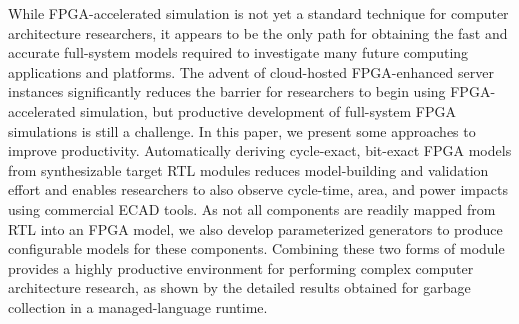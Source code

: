 While FPGA-accelerated simulation is not yet a standard technique for
computer architecture researchers, it appears to be the only path for
obtaining the fast and accurate full-system models required to
investigate many future computing applications and platforms.  The
advent of cloud-hosted FPGA-enhanced server instances significantly
reduces the barrier for researchers to begin using FPGA-accelerated
simulation, but productive development of full-system FPGA simulations
is still a challenge.  In this paper, we present some approaches to
improve productivity.  Automatically deriving cycle-exact, bit-exact
FPGA models from synthesizable target RTL modules reduces
model-building and validation effort and enables researchers to also
observe cycle-time, area, and power impacts using commercial ECAD
tools.  As not all components are readily mapped from RTL into an FPGA
model, we also develop parameterized generators to produce
configurable models for these components.  Combining these two forms
of module provides a highly productive environment for performing
complex computer architecture research, as shown by the detailed
results obtained for garbage collection in a managed-language runtime.
